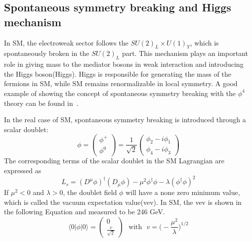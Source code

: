 \subsection{Spontaneous symmetry breaking and Higgs mechanism}

In SM, the electroweak sector follows the $SU(2)_{L}\times U(1)_{Y}$, which is spontaneously broken in the $SU(2)_{L}$ part. This mechanism plays an important role in giving mass to the mediator bosons in weak interaction and introducing the Higgs boson(Higgs).  Higgs is responsible for generating the mass of the fermions in SM, while SM remains renormalizable in local symmetry. A good example of showing the concept of spontaneous symmetry breaking with the $\phi^{4}$ theory can be found in~\cite{Peskin:1995ev}.

In the real case of SM, spontaneous symmetry breaking is introduced through a scalar doublet:
\[
\phi=
\begin{pmatrix}
\phi^{+}\\
\phi^{0}
\end{pmatrix}
=\frac{1}{\sqrt{2}}
\begin{pmatrix}
\phi_{2}-i\phi_{1}\\
\phi_{4}-i\phi_{3}
\end{pmatrix}
\]
The corresponding terms of the scalar doublet in the SM Lagrangian are expressed as
\begin{equation}
L_{s}=(D^{\mu}\phi)^{\dagger}(D_{\mu}\phi)-\mu^{2}\phi^{\dagger}\phi-\lambda(\phi^{\dagger}\phi)^{2}
\end{equation}
If $\mu^{2}<0$ and $\lambda>0$, the doublet field $\phi$ will have a none zero minimum value, which is called the vacuum expectation value(vev). In SM, the vev is shown in the following Equation and measured to be 246 GeV.
\begin{equation}\label{vev}
\langle 0 | \phi | 0 \rangle   =
\begin{pmatrix}
0\\
\frac{v}{\sqrt{2}}
\end{pmatrix}
~~~\textrm{with} ~~~  v=
\bigg(-\frac{\mu^{2}}{\lambda}\bigg)^{1/2}
\end{equation}

